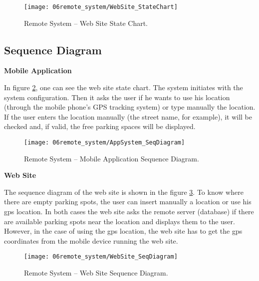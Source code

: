 \begin{figure}[H]
        \centering
        \texttt{[image: 06remote\_system/WebSite\_StateChart]}
        \caption{Remote System – Web Site State Chart.}
        \label{fig:StateChart_WebSite}
\end{figure}

\subsection{Sequence Diagram}
\textbf{Mobile Application}

In figure \ref{fig:SeqDiagram_application}, one can see the web site state chart. The system initiates with the system configuration. Then it asks the user if he wants to use his location (through the mobile phone's GPS tracking system) or type manually the location. If the user enters the location manually (the street name, for example), it will be checked and, if valid, the free parking spaces will be displayed.

\begin{figure}[H]
        \centering
        \texttt{[image: 06remote\_system/AppSystem\_SeqDiagram]}
        \caption{Remote System – Mobile Application Sequence Diagram.}
        \label{fig:SeqDiagram_application}
\end{figure}

\textbf{Web Site}

The sequence diagram of the web site is shown in the figure \ref{fig:SeqDiagram_WebSite}. To know where there are empty parking spots, the user can insert manually a location or use his \ac{gps} location. In both cases the web site asks the remote server (database) if there are available parking spots near the location and displays them to the user. However, in the case of using the \ac{gps} location, the web site has to get the \ac{gps} coordinates from the mobile device running the web site.

\begin{figure}[H]
        \centering
        \texttt{[image: 06remote\_system/WebSite\_SeqDiagram]}
        \caption{Remote System – Web Site Sequence Diagram.}
        \label{fig:SeqDiagram_WebSite}
\end{figure}